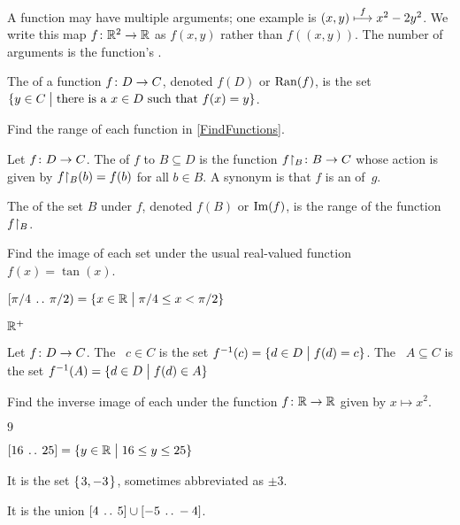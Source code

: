 \documentclass{ibl}
\begin{document}
A function may have multiple arguments; one example is 
$(x,y)\stackrel{f}{\longmapsto}x^2-2y^2$.
We write this map $\mbox{$f\colon \mathbb{R}^2\to \mathbb{R}$}$ as 
$f(x,y)$ rather than
$f((x,y))$.
The number of arguments is the function's .

\begin{df}
The  of a function $\mbox{$f\colon D\to C$}$,
denoted  $f(D)$ or $\operatorname{Ran}(f)$,
is the set
$\{y\in C \bigm| \text{there is a $x\in D$ such that $f(x)=y$}\}$.
\end{df}

\begin{ex}
Find the range of each function in \cref{FindFunctions}.  
\end{ex}

\begin{df}
Let $\mbox{$f\colon D\to C$}$.
The  of $f$ to $B\subseteq D$ is
the function $\mbox{${f}\mathord\upharpoonright_{B}\colon B\to C$}$ whose action is given by 
${f}\mathord\upharpoonright_{B}(b)=f(b)$ for all $b\in B$.
A synonym is that
$f$ is an  of~$g$.

The  of the set $B$ under $f$, 
denoted $f(B)$ or $\operatorname{Im}(f)$,
is the range of the function ${f}\mathord\upharpoonright_{B}$.
\end{df}

\begin{ex}
Find the image of each set under the usual real-valued function $f(x)=\tan(x)$.
\begin{exes}
\item $[\pi/4\:\mathinner{\ldotp\ldotp}\:\pi/2)=\{x\in\mathbb{R} \bigm| \pi/4\leq x<\pi/2\}$
\item {}
\item $\mathbb{R}^+$  
\end{exes}
\end{ex}

\begin{df}
Let $\mbox{$f\colon D\to C$}$.
The ~$c\in C$ is
the set $f^{-1}(c)=\{d\in D \bigm| f(d)=c\}$.
The ~$A\subseteq C$
is the set $f^{-1}(A)=\{d\in D \bigm| f(d)\in A\}$   
\end{df}

\begin{ex}
Find the inverse image of each under the function $\mbox{$f\colon \mathbb{R}\to \mathbb{R}$}$ 
given by $x\mapsto x^2$.
\begin{exes}
\item $9$
\item $[16\:\mathinner{\ldotp\ldotp}\:25]=\{y\in\mathbb{R} \bigm| 16\leq y\leq 25\}$
\end{exes}
\begin{ans}
\begin{exes}
\item It is the set $\mbox{$\{\hspace{0.1em}3,-3\hspace{0.1em}\}$}$, sometimes abbreviated as $\pm 3$.
\item It is the union $[4\:\mathinner{\ldotp\ldotp}\:5]\cup [-5\:\mathinner{\ldotp\ldotp}\:-4]$.    
\end{exes}
\end{ans}
\end{ex}
\end{document}
